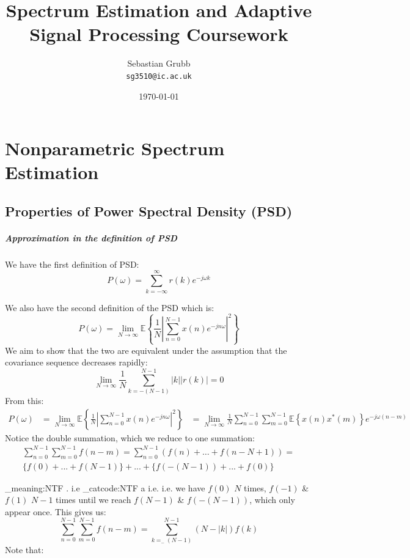 \documentclass[10pt,twoside,a4paper]{report}
\author{Sebastian Grubb\\
  \texttt{sg3510@ic.ac.uk}}
\title{Spectrum Estimation and Adaptive Signal Processing Coursework}
\date{\today}
\makeatletter
\newcommand\latinabbrev[1]{
  \peek_meaning:NTF . {%
    #1\@}%
  { \peek_catcode:NTF a {%
      #1.\@ }%
    {#1.\@}}}
\makeatother
\begin{document}
\maketitle
\tableofcontents
\newpage
\begingroup
\let\clearpage\relax
\chapter{Nonparametric Spectrum Estimation}
\section{Properties of Power Spectral Density (PSD)}
\paragraph{Approximation in the definition of PSD}
We have the first definition of PSD:
\begin{equation}
P(\omega) = \sum_{k = - \infty}^{\infty} r(k) e^{-j \omega k}
\end{equation}


We also have the second definition of the PSD which is:
\begin{equation}
P(\omega) = \lim\limits_{N \to \infty} \mathbb{E} \left\{ \frac{1}{N} \left| \sum_{n=0}^{N-1} x(n) e^{-j n \omega} \right|^{2} \right\}
\label{eq:second_def}
\end{equation}
We aim to show that the two are equivalent under the assumption that the covariance sequence decreases rapidly:
\begin{equation}
\lim\limits_{N \to \infty} \frac{1}{N} \sum_{k=-(N-1)}^{N-1} |k||r(k)| = 0
\label{eq:def_cond}
\end{equation}
From this:
\begin{align}
P(\omega) &= \lim\limits_{N \to \infty} \mathbb{E} \left\{ \frac{1}{N} \left| \sum_{n=0}^{N-1} x(n) e^{-j n \omega} \right|^{2} \right\} %
 &= \lim\limits_{N \to \infty} \frac{1}{N} \sum_{n=0}^{N-1} \sum_{m=0}^{N-1} \mathbb{E} \left\{ x(n)x^*  (m)\right\} e^{-j\omega (n-m)} \label{eq:psdtwosum}
\end{align}
Notice the double summation, which we reduce to one summation:
\begin{multline*}
\sum_{n=0}^{N-1} \sum_{m=0}^{N-1} f (n-m) =   \sum_{n=0}^{N-1} \left( f(n)+ \dots + f(n-N+1) \right) =\\
 \{f(0)+...+f(N-1)\} + ... + \{ f(-(N-1)) + ... + f(0) \}
\end{multline*}
\latinabbrev{i.e} we have $f(0)$ $N$ times, $f(-1)$ \& $f(1)$ $N-1$ times until we reach $f(N-1)$ \& $f(-(N-1))$, which only appear once. This gives us:
\begin{equation}
\sum_{n=0}^{N-1} \sum_{m=0}^{N-1} f (n-m) = \sum_{k=_-(N-1)}^{N-1} (N-|k|)f(k) \label{eq:twosumone}
\end{equation}
Note that:
\end{document}
